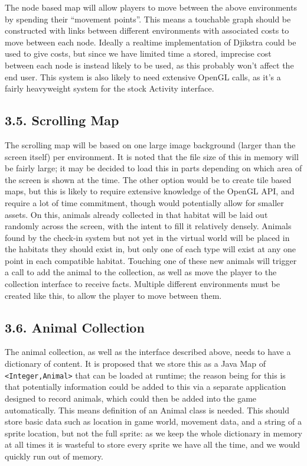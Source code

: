 \documentclass[]{report}
\begin{document}
The node based map will allow players to move between the above environments by spending their ``movement points''. This means a touchable graph should be constructed with links between different environments with associated costs to move between each node. Ideally a realtime implementation of Djikstra could be used to give costs, but since we have limited time a stored, imprecise cost between each node is instead likely to be used, as this probably won't affect the end user. This system is also likely to need extensive OpenGL calls, as it's a fairly heavyweight system for the stock Activity interface.

\subsection*{3.5. Scrolling Map}

The scrolling map will be based on one large image background (larger than the screen itself) per environment. It is noted that the file size of this in memory will be fairly large; it may be decided to load this in parts depending on which area of the screen is shown at the time. The other option would be to create tile based maps, but this is likely to require extensive knowledge of the OpenGL API, and require a lot of time commitment, though would potentially allow for smaller assets. On this, animals already collected in that habitat will be laid out randomly across the screen, with the intent to fill it relatively densely. Animals found by the check-in system but not yet in the virtual world will be placed in the habitats they should exist in, but only one of each type will exist at any one point in each compatible habitat. Touching one of these new animals will trigger a call to add the animal to the collection, as well as move the player to the collection interface to receive facts. Multiple different environments must be created like this, to allow the player to move between them.

\subsection*{3.6. Animal Collection}

The animal collection, as well as the interface described above, needs to have a dictionary of content. It is proposed that we store this as a Java Map of \verb|<Integer,Animal>| that can be loaded at runtime; the reason being for this is that potentially information could be added to this via a separate application designed to record animals, which could then be added into the game automatically. This means definition of an Animal class is needed. This should store basic data such as location in game world, movement data, and a string of a sprite location, but not the full sprite: as we keep the whole dictionary in memory at all times it is wasteful to store every sprite we have all the time, and we would quickly run out of memory. 
\end{document}
